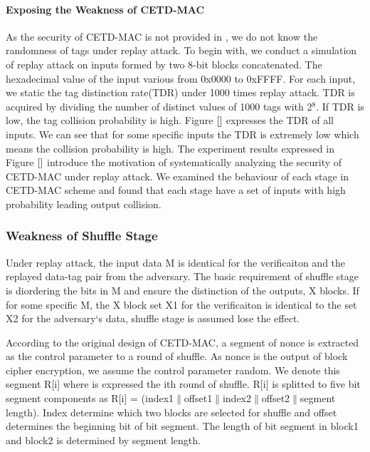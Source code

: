 \documentclass{article}
\begin{document}
\paragraph{Exposing the Weakness of CETD-MAC}
As the security of CETD-MAC is not provided in \cite{}, we do not know the randomness of tags under replay attack. To begin with, we conduct a simulation of replay attack on inputs formed by two 8-bit blocks concatenated. The hexadecimal value of the input various from 0x0000 to 0xFFFF. For each input, we static the tag distinction rate(TDR) under 1000 times replay attack. TDR is acquired by dividing the number of distinct values of 1000 tags with 2$^8$. If TDR is low, the tag collision probability is high. Figure $\ref{}$ expresses the TDR of all inputs. We can see that for some specific inputs the TDR is extremely low which means the collision probability is high. The experiment results expressed in Figure $\ref{}$ introduce the motivation of systematically analyzing the security of CETD-MAC under replay attack. We examined the behaviour of each stage in CETD-MAC scheme and found that each stage have a set of inputs with high probability leading output collision.

\subsubsection{Weakness of Shuffle Stage}
Under replay attack, the input data M is identical for the verificaiton and
the replayed data-tag pair from the adversary. The basic requirement of shuffle
stage is diordering the bits in M and ensure the distinction of the outputs, X
blocks. If for some specific M, the X block set X1 for the verificaiton is
identical to the set X2 for the adversary`s data, shuffle stage is assumed lose
the effect.

According to the
original design of CETD-MAC, a segment of nonce is extracted as the control
parameter to a round of shuffle.  As nonce is the output of block cipher
encryption, we assume the control parameter random. We denote this segment R[i] where is expressed
the ith round of shuffle. R[i] is splitted to five bit segment components as R[i] =
(index1$\|$offset1$\|$index2$\|$offset2$\|$segment length). Index determine
which two blocks are selected for shuffle and offset determines the beginning
bit of bit segment. The length of bit segment in block1 and block2 is determined
by segment length. 
\end{document}
